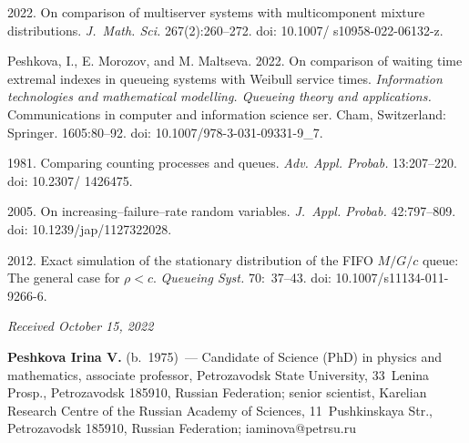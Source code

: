 \begin{multicols}{2}
{{\begin{thebibliography}{99}
 2022.  On comparison of multiserver systems with multicomponent mixture distributions. 
 \textit{J.~Math. Sci.} 267(2):260--272. doi:  10.1007/ s10958-022-06132-z.




Peshkova, I.,  E. Morozov, and M. Maltseva. 2022.  On comparison of waiting time extremal indexes  in queueing systems with Weibull service times.
\textit{Information technologies and mathematical modelling. Queueing theory and 
applications.}
Communications in computer and information science ser. Cham, Switzerland: Springer. 1605:80--92. doi: 10.1007/978-3-031-09331-9\_7.

 1981. Comparing counting processes and queues. \textit{Adv. Appl. Probab.} 13:207--220.  doi: 10.2307/ 1426475.
 

  2005.  On increasing--failure--rate random variables.
 \textit{J.~Appl. Probab.} 42:797--809. doi: 10.1239/jap/1127322028.


 2012. Exact simulation of the stationary distribution of the FIFO $M/G/c$ queue: 
The general case for $\rho < c$. \textit{Queueing Syst.} 70:~37--43.
doi: 10.1007/s11134-011-9266-6.
\end{thebibliography}

 }
 }

\end{multicols}

\vspace*{-6pt}

\hfill{\small\textit{Received October 15, 2022}}

\Contrl

\noindent
\textbf{Peshkova Irina V.} (b.\ 1975)~--- 
Candidate of Science (PhD) in physics and mathematics, associate professor, Petrozavodsk State University, 33~Lenina Prosp., 
Petrozavodsk 185910, Russian Federation; senior scientist, Karelian Research Centre of the Russian Academy of Sciences, 
11~Pushkinskaya Str., Petrozavodsk 185910, Russian Federation; \mbox{iaminova@petrsu.ru}



\label{end\stat}

\renewcommand{\bibname}{\protect\rm Литература}    
   